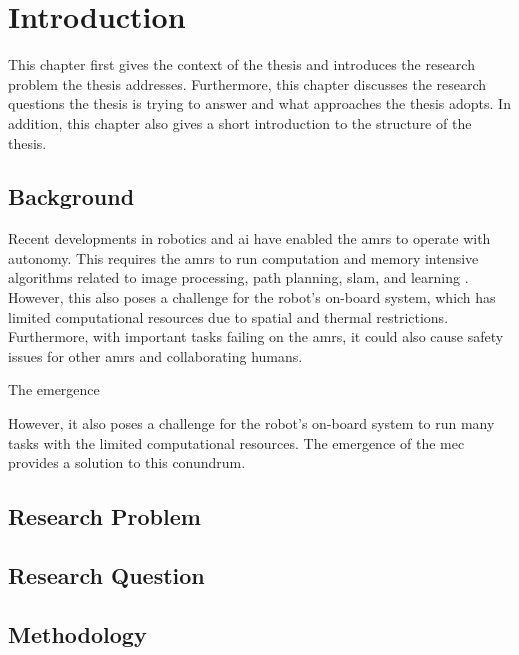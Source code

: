 \chapter{Introduction}

This chapter first gives the context of the thesis and introduces the research problem the thesis addresses. Furthermore, this chapter discusses the research questions the thesis is trying to answer and what approaches the thesis adopts. In addition, this chapter also gives a short introduction to the structure of the thesis.

\section{Background}

Recent developments in robotics and \gls{ai} have enabled the \glspl{amr} to operate with autonomy. This requires the \glspl{amr} to run computation and memory intensive algorithms related to image processing, path planning, \gls{slam}, and learning \cite{Saeik2021}. However, this also poses a challenge for the robot's on-board system, which has limited computational resources due to spatial and thermal restrictions. Furthermore, with important tasks failing on the \glspl{amr}, it could also cause safety issues for other \glspl{amr} and collaborating humans.

The emergence 

However, it also poses a challenge for the robot's on-board system to run many tasks with the limited computational resources. The emergence of the \gls{mec} provides a solution to this conundrum. 

\section{Research Problem}

\section{Research Question}

\section{Methodology}